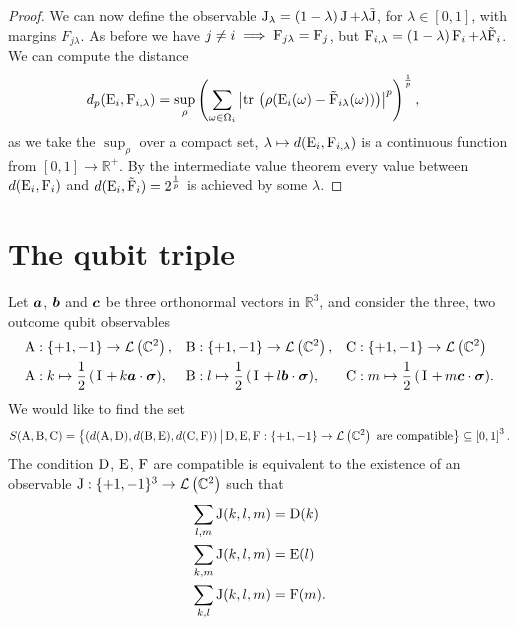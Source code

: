 \begin{lem}
\begin{proof}
    We can now define the observable $\operatorname{J}_\lambda = (1-\lambda) \operatorname{J} + \lambda \tilde{\operatorname{J}}$, for $\lambda\in[0,1]$, with margins $F_{j \lambda}$. As before we have $j\neq i \implies \operatorname{F}_{j\lambda} = \operatorname{F}_j$, but $\operatorname{F}_{i,\lambda} = (1-\lambda)\operatorname{F}_i + \lambda \tilde{\operatorname{F}}_i$. We can compute the distance
    \begin{align}
      d_p(\ope_i, \opf_{i,\lambda}) &= \sup_\rho\left(\sum_{\omega\in\Omega_i}\abs{\tr{\rho(\ope_i(\omega)- \tilde{\opf}_{i\lambda}(\omega))}}^p\right)^\frac{1}{p},
    \end{align}
    as we take the $\sup_\rho$ over a compact set, $\lambda\mapsto d(\operatorname{E}_i,\operatorname{F}_{i,\lambda})$ is a continuous function from $[0,1]\to\mathbb{R}^+$. By the intermediate value theorem every value between $d(\operatorname{E}_i, \operatorname{F}_{i})$ and $d(\operatorname{E}_i, \tilde{\operatorname{F}}_i) = 2^\frac{1}{p}$ is achieved by some $\lambda$.
  \end{proof}
\end{lem}


\section{The qubit triple}
\label{sec:qubit-triple}
Let $\bm{a}$, $\bm{b}$ and $\bm{c}$ be three orthonormal vectors in $\mathbb{R}^3$, and consider the three, two outcome qubit observables
\begin{align}
  \opa&:\{+1, -1\} \to \mathcal{L}\left(\mathbb{C}^2\right), & \opb&:\{+1, -1\} \to \mathcal{L}\left(\mathbb{C}^2\right), & \opc&:\{+1, -1\} \to \mathcal{L}\left(\mathbb{C}^2\right)\\
  \opa&:k\mapsto \qbit{k\boa}, &\opb&:l\mapsto \qbit{l\bob}, &\opc&:m\mapsto \qbit{m\boc}.
\end{align}
We would like to find the set
\begin{equation}
  S(\operatorname{A}, \operatorname{B}, \operatorname{C}) = \left\{(d(\operatorname{A}, \operatorname{D}), d(\operatorname{B}, \operatorname{E}), d(\operatorname{C}, \operatorname{F}))\,\middle|\,\operatorname{D}, \operatorname{E}, \operatorname{F}:\{+1, -1\}\to\mathcal{L}\left(\mathbb{C}^2\right) \text{ are compatible}\right\}\subseteq \left[0,1\right]^3.
\end{equation}
The condition $\operatorname{D}$, $\operatorname{E}$, $\operatorname{F}$ are compatible is equivalent to the existence of an observable $\operatorname{J}:\{+1,-1\}^3\to\mathcal{L}\left(\mathbb{C}^2\right)$ such that
\begin{align}
  \sum_{l,m}\operatorname{J}(k,l,m) &= \operatorname{D}(k)\\
  \sum_{k,m}\operatorname{J}(k,l,m) &= \operatorname{E}(l)\\
  \sum_{k,l}\operatorname{J}(k,l,m) &= \operatorname{F}(m).
\end{align}

